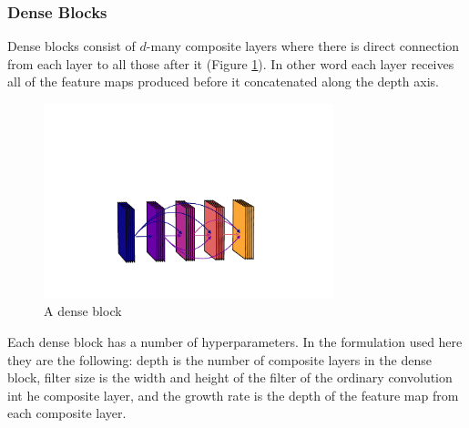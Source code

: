 \subsubsection{Dense Blocks}
Dense blocks consist of $d$-many composite layers where there is direct connection from each layer to all those after it (Figure \ref{fig:machine_learning:dense_block}). 
In other word each layer receives all of the feature maps produced before it concatenated along the depth axis. 
\begin{figure}[h!]
    \includegraphics[width=0.75\textwidth]{figures/machine_learning/dense_block.pdf}
    \caption{A dense block}
        \label{fig:machine_learning:dense_block}
\end{figure}
Each dense block has a number of hyperparameters. In the formulation used here they are the following: depth is the number of composite layers in the dense block, filter size is the width and height of the filter of the ordinary convolution int he composite layer, and the growth rate is the depth of the feature map from each composite layer.


